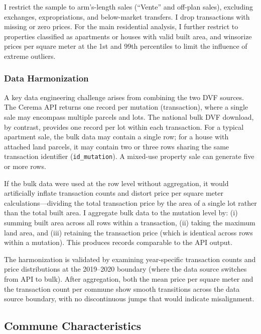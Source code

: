 \documentclass[12pt]{article}
\begin{document}
I restrict the sample to arm's-length sales (``Vente'' and off-plan sales), excluding exchanges, expropriations, and below-market transfers. I drop transactions with missing or zero prices. For the main residential analysis, I further restrict to properties classified as apartments or houses with valid built area, and winsorize prices per square meter at the 1st and 99th percentiles to limit the influence of extreme outliers.

\subsubsection{Data Harmonization}\label{subsec:harmonization}

A key data engineering challenge arises from combining the two DVF sources. The Cerema API returns one record per mutation (transaction), where a single sale may encompass multiple parcels and lots. The national bulk DVF download, by contrast, provides one record per lot within each transaction. For a typical apartment sale, the bulk data may contain a single row; for a house with attached land parcels, it may contain two or three rows sharing the same transaction identifier (\texttt{id\_mutation}). A mixed-use property sale can generate five or more rows.

If the bulk data were used at the row level without aggregation, it would artificially inflate transaction counts and distort price per square meter calculations---dividing the total transaction price by the area of a single lot rather than the total built area. I aggregate bulk data to the mutation level by: (i) summing built area across all rows within a transaction, (ii) taking the maximum land area, and (iii) retaining the transaction price (which is identical across rows within a mutation). This produces records comparable to the API output.

The harmonization is validated by examining year-specific transaction counts and price distributions at the 2019--2020 boundary (where the data source switches from API to bulk). After aggregation, both the mean price per square meter and the transaction count per commune show smooth transitions across the data source boundary, with no discontinuous jumps that would indicate misalignment.

\subsection{Commune Characteristics}
\end{document}
